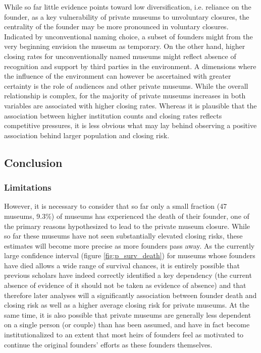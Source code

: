 \documentclass[12pt]{article}
\begin{document}
While so far little evidence points toward low diversification, i.e. reliance on the founder, as a key vulnerability of private museums to unvoluntary closures, the centrality of the founder may be more pronounced in voluntary closures. 
Indicated by unconventional naming choice, a subset of founders might from the very beginning envision the museum as temporary.
On the other hand, higher closing rates for unconventionally named museums might reflect absence of recognition and support by third parties in the environment.
A dimensions where the influence of the environment can however be ascertained with greater certainty is the role of audiences and other private museums.
While the overall relationship is complex, for the majority of private museums increases in both variables are associated with higher closing rates.
Whereas it is plausible that the association between higher institution counts and closing rates reflects competitive pressures, it is less obvious what may lay behind observing a positive association behind larger population and closing risk. 
\subsection*{Conclusion}

\subsubsection*{Limitations}






However, it is necessary to consider that so far only a small fraction (47 museums, 9.3\%) of museums has experienced the death of their founder, one of the primary reasons hypothesized to lead to the private museum closure. 
While so far these museums have not seen substantially elevated closing risks, these estimates will become more precise as more founders pass away.
As the currently large confidence interval (figure \ref{fig:p_surv_death}) for museums whose founders have died allows a wide range of survival chances, it is entirely possible that previous scholars have indeed correctly identified a key dependency (the current absence of evidence of it should not be taken as evidence of absence) and that therefore later analyses will a significantly association between founder death and closing risk as well as a higher average closing risk for private museums.
At the same time, it is also possible that private museums are generally less dependent on a single person (or couple) than has been assumed, and have in fact become institutionalized to an extent that most heirs of founders feel as motivated to continue the original founders' efforts as these founders themselves.
\end{document}
